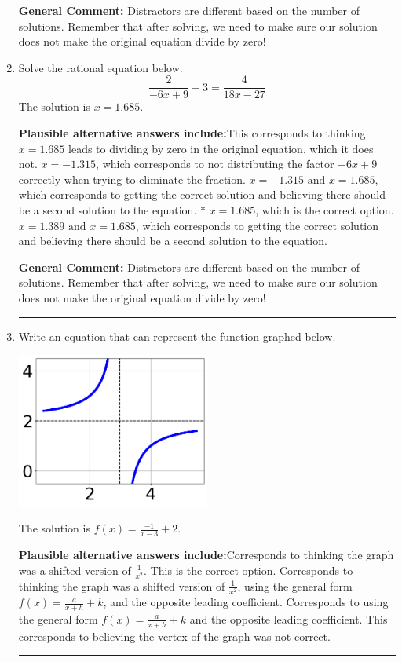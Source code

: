 \documentclass{extbook}[14pt]
\newcommand{\litem}[1]{\item #1

\rule{\textwidth}{0.4pt}}
\begin{document}
\begin{enumerate}
{\textbf{General Comment:} Distractors are different based on the number of solutions. Remember that after solving, we need to make sure our solution does not make the original equation divide by zero!
}
\litem{
Solve the rational equation below.
\[ \frac{2}{-6x + 9} + 3 = \frac{4}{18x -27} \]The solution is \( x = 1.685 \).\begin{enumerate}[label=\Alph*.]
\textbf{Plausible alternative answers include:}This corresponds to thinking $x = 1.685$ leads to dividing by zero in the original equation, which it does not.
$x = -1.315$, which corresponds to not distributing the factor $-6x + 9$ correctly when trying to eliminate the fraction.
$x = -1.315 \text{ and } x = 1.685$, which corresponds to getting the correct solution and believing there should be a second solution to the equation.
* $x = 1.685$, which is the correct option.
$x = 1.389 \text{ and } x = 1.685$, which corresponds to getting the correct solution and believing there should be a second solution to the equation.
\end{enumerate}

\textbf{General Comment:} Distractors are different based on the number of solutions. Remember that after solving, we need to make sure our solution does not make the original equation divide by zero!
}
\litem{
Write an equation that can represent the function graphed below.

\begin{center}
    \includegraphics[width=0.5\textwidth]{../Figures/rationalGraphToEquationC.png}
\end{center}


The solution is \( f(x) = \frac{-1}{x - 3} + 2 \).\begin{enumerate}[label=\Alph*.]
\textbf{Plausible alternative answers include:}Corresponds to thinking the graph was a shifted version of $\frac{1}{x^2}$.
This is the correct option.
Corresponds to thinking the graph was a shifted version of $\frac{1}{x^2}$, using the general form $f(x) = \frac{a}{x+h}+k$, and the opposite leading coefficient.
Corresponds to using the general form $f(x) = \frac{a}{x+h}+k$ and the opposite leading coefficient.
This corresponds to believing the vertex of the graph was not correct.
\end{enumerate}

}
\end{enumerate}
\end{document}
